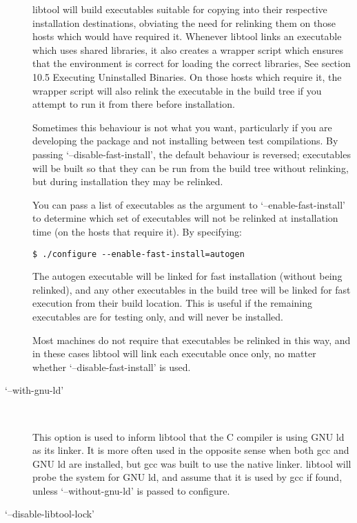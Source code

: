 \begin{description}
libtool will build executables suitable for copying into their respective installation destinations, obviating the need for relinking them on those hosts which would have required it. Whenever libtool links an executable which uses shared libraries, it also creates a wrapper script which ensures that the environment is correct for loading the correct libraries, See section 10.5 Executing Uninstalled Binaries. On those hosts which require it, the wrapper script will also relink the executable in the build tree if you attempt to run it from there before installation. 


Sometimes this behaviour is not what you want, particularly if you are developing the package and not installing between test compilations. By passing `--disable-fast-install', the default behaviour is reversed; executables will be built so that they can be run from the build tree without relinking, but during installation they may be relinked. 


You can pass a list of executables as the argument to `--enable-fast-install' to determine which set of executables will not be relinked at installation time (on the hosts that require it). By specifying: 

\begin{verbatim}
$ ./configure --enable-fast-install=autogen
\end{verbatim}



 The autogen executable will be linked for fast installation (without being relinked), and any other executables in the build tree will be linked for fast execution from their build location. This is useful if the remaining executables are for testing only, and will never be installed. 


Most machines do not require that executables be relinked in this way, and in these cases libtool will link each executable once only, no matter whether `--disable-fast-install' is used. 

\item[`--with-gnu-ld']
\ 

%
This option is used to inform libtool that the C compiler is using GNU ld as its linker. It is more often used in the opposite sense when both gcc and GNU ld are installed, but gcc was built to use the native linker. libtool will probe the system for GNU ld, and assume that it is used by gcc if found, unless `--without-gnu-ld' is passed to configure. 


\item[`--disable-libtool-lock']
\ 


\end{description}
